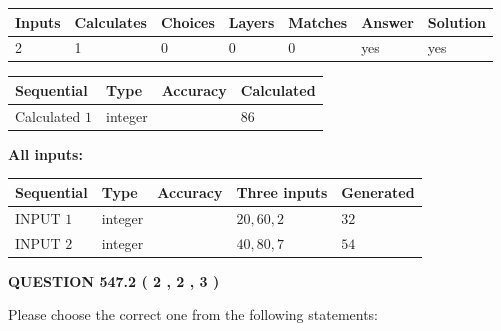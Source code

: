 \documentclass[12pt]{article}
\begin{document}
 
\noindent{}
 
 

 
   
   
   
   
\noindent\begin{tabular}{|l|l|l|l|l|l|l|}
 \hline
Inputs & Calculates & Choices & Layers & Matches & Answer & Solution \\ \hline
 2  & 
 1  & 
 0
  & 
 0  & 
 0  & 
  yes & 
  yes 
  \\ \hline
 \end{tabular}
   
   
   
   
\noindent{}
   
   
  
  
\noindent\begin{tabular}{|l|l|l|l|}
\hline
 Sequential & Type & Accuracy & Calculated \\ 
\hline
 
 
  Calculated $  1 $ & integer &  & 
  $ 86 $ 
 \\  \hline  
 \end{tabular}
   
   
   
   
\noindent\vspace{0.1in}\hspace{-0.08in} {\textbf{\Large{All inputs: }}}
   
   
  
  
\noindent\begin{tabular}{|l|l|l|l|l|}
\hline
 Sequential & Type & Accuracy & Three inputs & Generated \\ 
\hline
 
 
  INPUT $  1 $ & integer &  & $
 20
 , 
 60
 , 
 2
 $ & $ 32 $ 
 \\  \hline  
 
 
  INPUT $  2 $ & integer &  & $
 40
 , 
 80
 , 
 7
 $ & $ 54 $ 
 \\  \hline  
 \end{tabular}
   
   
  
\vspace{0.2in}
  
{\textbf{\Large{QUESTION
547.2 
 ( 2 , 2 , 3 )
}}}
  
  
Please choose the correct one from the following statements:
 
\end{document}
